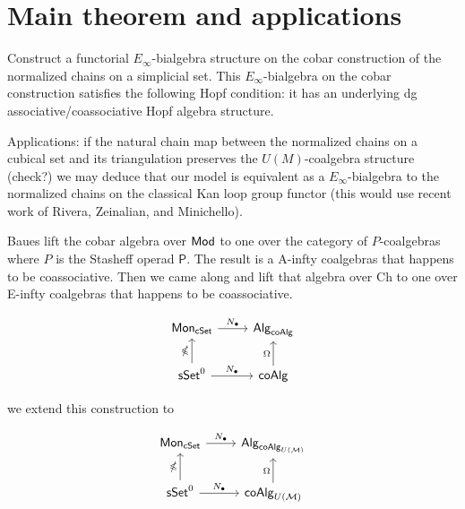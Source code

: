 \section{Main theorem and applications}

Construct a functorial $E_{\infty}$-bialgebra structure on the cobar construction of the normalized chains on a simplicial set. This $E_{\infty}$-bialgebra on the cobar construction satisfies the following Hopf condition: it has an underlying dg associative/coassociative Hopf algebra structure. 

Applications: if the natural chain map between the normalized chains on a cubical set and its triangulation preserves the $U(M)$-coalgebra structure (check?) we may deduce that our model is equivalent as a $E_{\infty}$-bialgebra to the normalized chains on the classical Kan loop group functor (this would use recent work of Rivera, Zeinalian, and Minichello).


Baues lift the cobar algebra over $\mathsf{Mod}$ to one over the category of $P$-coalgebras where $P$ is the Stasheff operad $\mathsf P$. The result is a A-infty coalgebras that happens to be coassociative. Then we came along and lift that algebra over Ch to one over E-infty coalgebras that happens to be coassociative.


\begin{equation*}
\begin{tikzcd}
\Mon_{\cSet} \arrow[r, "\chains"] & \Alg_{\coAlg} \\
\sSet^0 \arrow[r, "\chains"] \arrow[u, "\gcobar"] & \coAlg \arrow[u, "\cobar"]
\end{tikzcd}
\end{equation*}

we extend this construction to

\begin{equation*}
\begin{tikzcd}
\Mon_{\cSet} \arrow[r, "\chains"] & \Alg_{\coAlg_{U(\M)}} \\
\sSet^0 \arrow[r, "\chains"] \arrow[u, "\gcobar"] & \coAlg_{U(\M)} \arrow[u, "\cobar"]
\end{tikzcd}
\end{equation*}